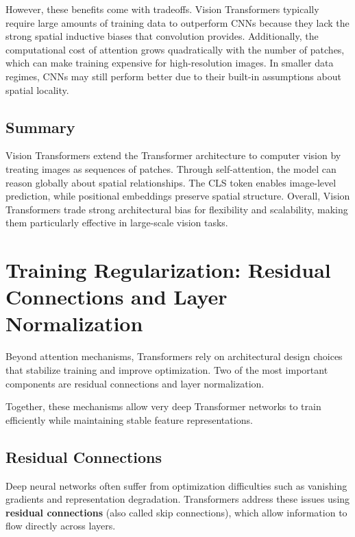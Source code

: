 \documentclass[11pt]{article}
\begin{document}
However, these benefits come with tradeoffs. Vision Transformers typically require large amounts of training data to outperform CNNs because they lack the strong spatial inductive biases that convolution provides. Additionally, the computational cost of attention grows quadratically with the number of patches, which can make training expensive for high-resolution images. In smaller data regimes, CNNs may still perform better due to their built-in assumptions about spatial locality.

\subsection{Summary}

Vision Transformers extend the Transformer architecture to computer vision by treating images as sequences of patches. Through self-attention, the model can reason globally about spatial relationships. The CLS token enables image-level prediction, while positional embeddings preserve spatial structure. Overall, Vision Transformers trade strong architectural bias for flexibility and scalability, making them particularly effective in large-scale vision tasks.

\section{Training Regularization: Residual Connections and Layer Normalization}

Beyond attention mechanisms, Transformers rely on architectural design choices that stabilize training and improve optimization. Two of the most important components are residual connections and layer normalization.

Together, these mechanisms allow very deep Transformer networks to train efficiently while maintaining stable feature representations.

\subsection{Residual Connections}

Deep neural networks often suffer from optimization difficulties such as vanishing gradients and representation degradation. Transformers address these issues using \textbf{residual connections} (also called skip connections), which allow information to flow directly across layers.
\end{document}
